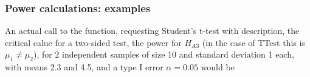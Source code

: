 %
%
%
%
%
%
%
%
%
%


\subsubsection{Power calculations: examples}
An actual call to the function, requesting Student's t-test with description, the critical calue for a two-sided test, the power for $H_{A3}$ (in the case of \textsf{TTest} this is $\mu_1 \neq \mu_2$), for 2 independent samples of size 10 and standard deviation 1 each, with means 2.3 and 4.5, and a type I error $\alpha=0.05$ would be

